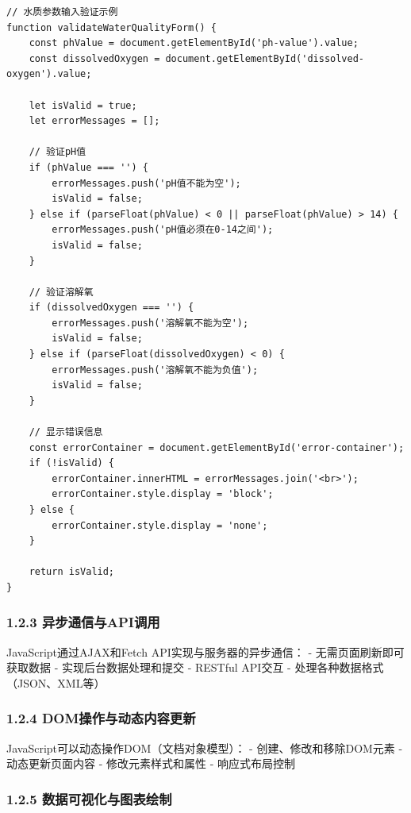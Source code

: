 \begin{lstlisting}
// 水质参数输入验证示例
function validateWaterQualityForm() {
    const phValue = document.getElementById('ph-value').value;
    const dissolvedOxygen = document.getElementById('dissolved-oxygen').value;
    
    let isValid = true;
    let errorMessages = [];
    
    // 验证pH值
    if (phValue === '') {
        errorMessages.push('pH值不能为空');
        isValid = false;
    } else if (parseFloat(phValue) < 0 || parseFloat(phValue) > 14) {
        errorMessages.push('pH值必须在0-14之间');
        isValid = false;
    }
    
    // 验证溶解氧
    if (dissolvedOxygen === '') {
        errorMessages.push('溶解氧不能为空');
        isValid = false;
    } else if (parseFloat(dissolvedOxygen) < 0) {
        errorMessages.push('溶解氧不能为负值');
        isValid = false;
    }
    
    // 显示错误信息
    const errorContainer = document.getElementById('error-container');
    if (!isValid) {
        errorContainer.innerHTML = errorMessages.join('<br>');
        errorContainer.style.display = 'block';
    } else {
        errorContainer.style.display = 'none';
    }
    
    return isValid;
}
\end{lstlisting}

\subsubsection{1.2.3
异步通信与API调用}\label{ux5f02ux6b65ux901aux4fe1ux4e0eapiux8c03ux7528}

JavaScript通过AJAX和Fetch API实现与服务器的异步通信： -
无需页面刷新即可获取数据 - 实现后台数据处理和提交 - RESTful API交互 -
处理各种数据格式（JSON、XML等）

\subsubsection{1.2.4
DOM操作与动态内容更新}\label{domux64cdux4f5cux4e0eux52a8ux6001ux5185ux5bb9ux66f4ux65b0}

JavaScript可以动态操作DOM（文档对象模型）： - 创建、修改和移除DOM元素 -
动态更新页面内容 - 修改元素样式和属性 - 响应式布局控制

\subsubsection{1.2.5
数据可视化与图表绘制}\label{ux6570ux636eux53efux89c6ux5316ux4e0eux56feux8868ux7ed8ux5236}

